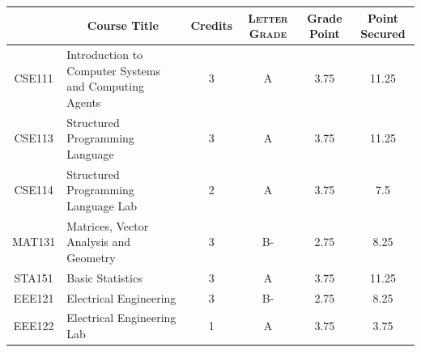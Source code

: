 \documentclass[11pt]{article}
\newcommand*{\numtwo}[1]{\pgfmathprintnumber[
                    fixed, precision=2, fixed zerofill=true]{#1}}
\begin{document}
                \begin{center}
                    \renewcommand{\arraystretch}{1.08}
                    
                \begin{tabular}{|c|l|c|>{\scshape}c|c|c|}
                \hline  \rule[-1ex]{0pt}{3.5ex} {\centering{\bf Course Code}} &  \multicolumn{1}{c|}{\textbf{Course Title}}  & {\bf Credits} & {\bf Letter Grade} & {\bf Grade Point} & {\bf Point Secured}  \\ 
                \hline   CSE111 &  Introduction to Computer Systems and Computing Agents		 & 3 & A & 3.75 & 11.25 \\ %
                \hline   CSE113 &  Structured Programming Language		 & 3 & A & 3.75 & 11.25 \\ %
                \hline   CSE114 &  Structured Programming Language Lab		 & 2 & A & 3.75 & 7.5 \\ %
                \hline   MAT131 &  Matrices, Vector Analysis and Geometry		 & 3 & B- & 2.75 & 8.25 \\ %
                \hline   STA151 &  Basic Statistics		 & 3 & A & 3.75 & 11.25 \\ %
                \hline   EEE121 &  Electrical Engineering		 & 3 & B- & 2.75 & 8.25 \\ %
                \hline   EEE122 &  Electrical Engineering Lab		 & 1 & A & 3.75 & 3.75 \\ %

\hline                %
                \end{tabular}
                \end{center}
                \renewcommand{\arraystretch}{1.03}
\end{document}
